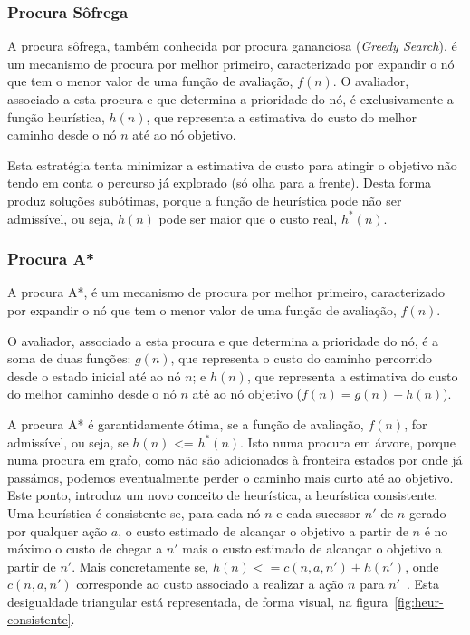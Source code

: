 \subsubsection{Procura Sôfrega}\label{subsubsec:procura-sofrega}

A procura sôfrega, também conhecida por procura gananciosa (\textit{Greedy Search}), é um mecanismo de procura por melhor primeiro, caracterizado por expandir o nó que tem o menor valor de uma função de avaliação, $f(n)$.
O avaliador, associado a esta procura e que determina a prioridade do nó, é exclusivamente a função heurística, $h(n)$, que representa a estimativa do custo do melhor caminho desde o nó $n$ até ao nó objetivo.

Esta estratégia tenta minimizar a estimativa de custo para atingir o objetivo não tendo em conta o percurso já explorado (só olha para a frente).
Desta forma produz soluções subótimas, porque a função de heurística pode não ser admissível, ou seja, $h(n)$ pode ser maior que o custo real, $h^*(n)$.

\subsubsection{Procura A*}\label{subsubsec:procura-a-estrela}

A procura A*, é um mecanismo de procura por melhor primeiro, caracterizado por expandir o nó que tem o menor valor de uma função de avaliação, $f(n)$.

O avaliador, associado a esta procura e que determina a prioridade do nó, é a soma de duas funções: $g(n)$, que representa o custo do caminho percorrido desde o estado inicial até ao nó $n$; e $h(n)$, que representa a estimativa do custo do melhor caminho desde o nó $n$ até ao nó objetivo ($f(n) = g(n) + h(n)$).

A procura A* é garantidamente ótima, se a função de avaliação, $f(n)$, for admissível, ou seja, se $h(n)$ <= $h^*(n)$.
Isto numa procura em árvore, porque numa procura em grafo, como não são adicionados à fronteira estados por onde já passámos, podemos eventualmente perder o caminho mais curto até ao objetivo.
Este ponto, introduz um novo conceito de heurística, a heurística consistente.
Uma heurística é consistente se, para cada nó $n$ e cada sucessor $n'$ de $n$ gerado por qualquer ação $a$, o custo estimado de alcançar o objetivo a partir de $n$ é no máximo o custo de chegar a $n'$ mais o custo estimado de alcançar o objetivo a partir de $n'$.
Mais concretamente se, $h(n) <= c(n, a, n') + h(n')$, onde $c(n, a, n')$ corresponde ao custo associado a realizar a ação $n$ para $n'$~\cite{ist:leic:resumos:procura-informada}.
Esta desigualdade triangular está representada, de forma visual, na figura~\ref{fig:heur-consistente}.

